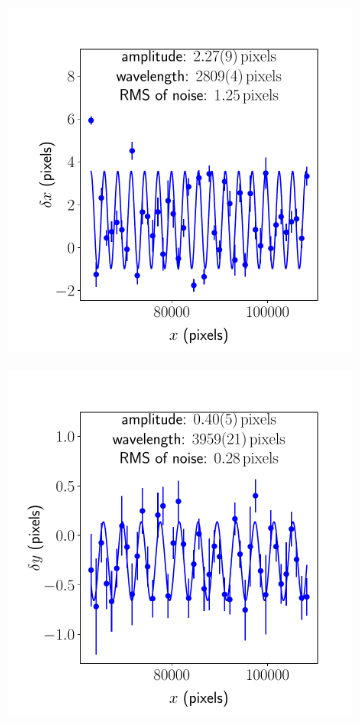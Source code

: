 \documentclass{article}
\begin{document}
\begin{figure}[ht]
\begin{subfigure}{0.24\linewidth}
		\caption{}
		\label{fig:sinewave2yy2}
	\end{subfigure}
	\begin{subfigure}{0.24\linewidth}
		\includegraphics[width=\linewidth]{sine-wave-4-xx-2.pdf}
		\caption{}
		\label{fig:sinewave4xx2}
	\end{subfigure}
	\begin{subfigure}{0.24\linewidth}
		\includegraphics[width=\linewidth]{sine-wave-4-yx-2.pdf}

\end{subfigure}
\end{figure}
\end{document}
